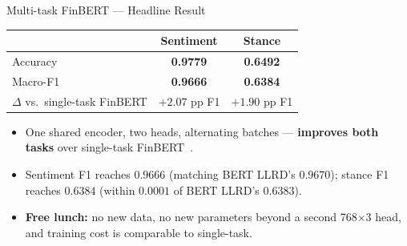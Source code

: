 \documentclass[10pt, aspectratio=169]{beamer}
\begin{document}
\begin{frame}{Multi-task FinBERT --- Headline Result}
    \centering
    {\large
    \begin{tabular}{lcc}
        \toprule
                                 & \textbf{Sentiment}         & \textbf{Stance}            \\
        \midrule
        Accuracy                 & \textbf{0.9779}            & \textbf{0.6492}            \\
        Macro-F1                 & \textbf{0.9666}            & \textbf{0.6384}            \\
        \midrule
        $\Delta$ vs.\ single-task FinBERT & \alert{$+2.07$ pp F1} & \alert{$+1.90$ pp F1} \\
        \bottomrule
    \end{tabular}
    }

    \vspace{0.8em}
    \begin{itemize}\setlength{\itemsep}{0.25em}
        \item One shared encoder, two heads, alternating batches --- \textbf{improves both tasks} over single-task FinBERT~\cite{liu2019mt-dnn}.
        \item Sentiment F1 reaches $0.9666$ (matching BERT LLRD's $0.9670$); stance F1 reaches $0.6384$ (within $0.0001$ of BERT LLRD's $0.6383$).
        \item \textbf{Free lunch:} no new data, no new parameters beyond a second 768$\times$3 head, and training cost is comparable to single-task.
    \end{itemize}
\end{frame}
\end{document}
